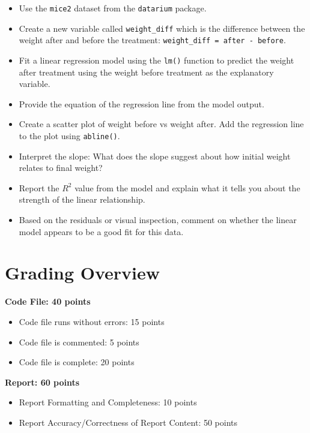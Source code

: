 \documentclass{article}
\begin{document}
\begin{itemize}
    \item Use the \texttt{mice2} dataset from the \texttt{datarium} package.
    \item Create a new variable called \texttt{weight\_diff} which is the difference between the weight after and before the treatment: \texttt{weight\_diff = after - before}.
    \item Fit a linear regression model using the \texttt{lm()} function to predict the weight after treatment using the weight before treatment as the explanatory variable.
    \item Provide the equation of the regression line from the model output.
    \item Create a scatter plot of weight before vs weight after. Add the regression line to the plot using \texttt{abline()}.
    \item Interpret the slope: What does the slope suggest about how initial weight relates to final weight?
    \item Report the $R^2$ value from the model and explain what it tells you about the strength of the linear relationship.
    \item Based on the residuals or visual inspection, comment on whether the linear model appears to be a good fit for this data.
\end{itemize}


\newpage
\section*{Grading Overview}

\textbf{Code File: 40 points}
\begin{itemize}
    \item Code file runs without errors: 15 points
    \item Code file is commented: 5 points
    \item Code file is complete: 20 points
\end{itemize}

\textbf{Report: 60 points}
\begin{itemize}
    \item Report Formatting and Completeness: 10 points
    \item Report Accuracy/Correctness of Report Content: 50 points
\end{itemize}
\end{document}
